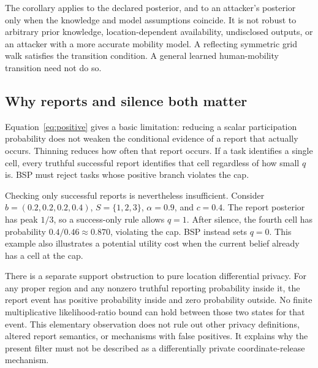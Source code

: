 \documentclass[3p,times]{elsarticle}
\begin{document}
The corollary applies to the declared posterior, and to an attacker's posterior only when the knowledge and model assumptions coincide. It is not robust to arbitrary prior knowledge, location-dependent availability, undisclosed outputs, or an attacker with a more accurate mobility model. A reflecting symmetric grid walk satisfies the transition condition. A general learned human-mobility transition need not do so.

\subsection{Why reports and silence both matter}
Equation~\eqref{eq:positive} gives a basic limitation: reducing a scalar participation probability does not weaken the conditional evidence of a report that actually occurs. Thinning reduces how often that report occurs. If a task identifies a single cell, every truthful successful report identifies that cell regardless of how small $q$ is. BSP must reject tasks whose positive branch violates the cap.

Checking only successful reports is nevertheless insufficient. Consider $b=(0.2,0.2,0.2,0.4)$, $S=\{1,2,3\}$, $\alpha=0.9$, and $c=0.4$. The report posterior has peak $1/3$, so a success-only rule allows $q=1$. After silence, the fourth cell has probability $0.4/0.46\approx0.870$, violating the cap. BSP instead sets $q=0$. This example also illustrates a potential utility cost when the current belief already has a cell at the cap.

There is a separate support obstruction to pure location differential privacy. For any proper region and any nonzero truthful reporting probability inside it, the report event has positive probability inside and zero probability outside. No finite multiplicative likelihood-ratio bound can hold between those two states for that event. This elementary observation does not rule out other privacy definitions, altered report semantics, or mechanisms with false positives. It explains why the present filter must not be described as a differentially private coordinate-release mechanism.
\end{document}

